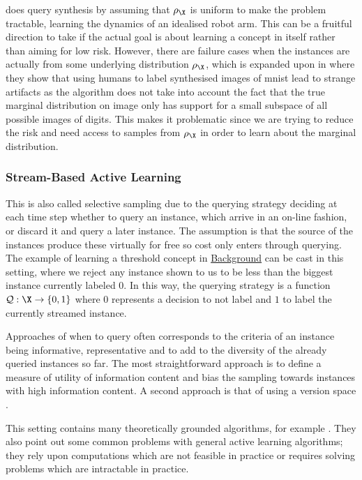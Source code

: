 \citep{cohn96_activ_learn_with_statis_model} does query synthesis by assuming
that \(\rho_{\X}\) is uniform to make the problem tractable, learning the
dynamics of an idealised robot arm. This can be a fruitful direction to take if
the actual goal is about learning a concept in itself rather than aiming for low
risk. However, there are failure cases when the instances are actually from some
underlying distribution \(\rho_{\X}\), which is expanded upon in
\citep{baum92_query} where they show that using humans to label synthesised
images of mnist lead to strange artifacts as the algorithm does not take into
account the fact that the true marginal distribution on image only has support
for a small subspace of all possible images of digits. This makes it problematic
since we are trying to reduce the risk and need access to samples from
\(\rho_{\X}\) in order to learn about the marginal distribution.

\subsubsection{Stream-Based Active Learning} This is also called selective sampling
\citep{cohn94_improv_gener_with_activ_learn} due to the querying strategy
deciding at each time step whether to query an instance, which arrive in an
on-line fashion, or discard it and query a later instance. The assumption is
that the source of the instances produce these virtually for free so cost only
enters through querying. The example of learning a threshold concept in
\hyperref[sec:background]{Background} can be cast in this setting, where we reject any instance
shown to us to be less than the biggest instance currently labeled \(0\). In
this way, the querying strategy is a function \(\querstrat: \X \to \{0, 1\}\)
where \(0\) represents a decision to not label and \(1\) to label the currently
streamed instance.

Approaches of when to query often corresponds to the criteria of an instance
being informative, representative and to add to the diversity of the already
queried instances so far. The most straightforward approach is to define a
measure of utility of information content and bias the sampling towards
instances with high information content. A second approach is that of using a
version space \citep{tong01_suppor_vector_machin_activ_learn}.

This setting contains many theoretically grounded algorithms, for example
\citep{dasgupta08}. They also point out some common problems with general active
learning algorithms; they rely upon computations which are not feasible in
practice or requires solving problems which are intractable in practice.

